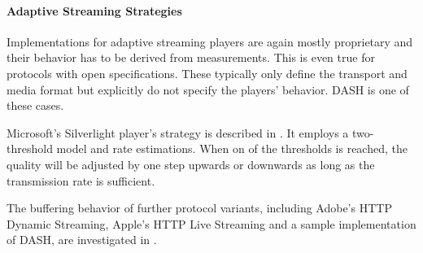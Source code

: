 \paragraph{Adaptive Streaming Strategies}

Implementations for adaptive streaming players are again mostly proprietary and their behavior has to be derived from measurements. This is even true for protocols with open specifications. These typically only define the transport and media format but explicitly do not specify the players' behavior. \Gls{DASH} is one of these cases.

Microsoft's Silverlight player's strategy is described in \cite{BLTJ:BLTJ20505}. It employs a two-threshold model and rate estimations. When on of the thresholds is reached, the quality will be adjusted by one step upwards or downwards as long as the transmission rate is sufficient.

The buffering behavior of further protocol variants, including Adobe's \gls{HTTP} Dynamic Streaming, Apple's \gls{HTTP} Live Streaming and a sample implementation of \gls{DASH}, are investigated in \cite{Muller:2012:EDA:2151677.2151686,akhshabi2011experimental}.






